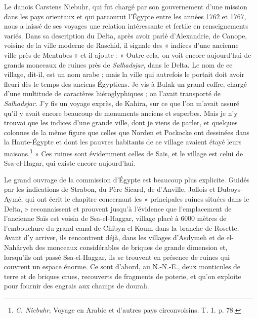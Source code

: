 \documentclass[letterpaper,twocolumn,openany,nodeprecatedcode]{dndbook}
\begin{document}
Le danois Carstens Niebuhr, qui fut chargé par son gouvernement d'une mission dans les pays orientaux et qui parcourut l'Égypte entre les années 1762 et 1767, nous a laissé de ses voyages une relation intéressante et fertile en renseignements variés. Dans sa description du Delta, après avoir parlé d'Alexandrie, de Canope, voisine de la ville moderne de Raschid, il signale des « indices d'une ancienne ville près de Mentubes » et il ajoute : « Outre cela, on voit encore aujourd'hui de grands monceaux de ruines près de \emph{Salhadsjar}, dans le Delta. Le nom de ce village, dit-il, est un nom arabe ; mais la ville qui autrefois le portait doit avoir fleuri dès le temps des anciens Égyptiens. Je vis à Bulak un grand coffre, chargé d'une multitude de caractères hiéroglyphiques ; on l'avait transporté de \emph{Salhadsjar}. J'y fis un voyage exprès, de Kahira, sur ce que l'on m'avait assuré qu'il y avait encore beaucoup de monuments anciens et superbes. Mais je n'y trouvai que les indices d'une grande ville, dont je viens de parler, et quelques colonnes de la même figure que celles que Norden et Pockocke ont dessinées dans la Haute-Égypte et dont les pauvres habitants de ce village avaient étayé leurs maisons.\footnote{\emph{C. Niebuhr}, Voyage en Arabie et d'autres pays circonvoisins. T. 1. p. 78.} » Ces ruines sont évidemment celles de Saïs, et le village est celui de Ssa-el-Hagar, qui existe encore aujourd'hui.

Le grand ouvrage de la commission d'Égypte est beaucoup plus explicite. Guidés par les indications de Strabon, du Père Sicard, de d'Anville, Jollois et Duboys-Aymé, qui ont écrit le chapitre concernant les « principales ruines situées dans le Delta, » reconnaissent et prouvent jusqu'à l'évidence que l'emplacement de l'ancienne Saïs est voisin de Ssa-el-Haggar, village placé à 6000 mètres de l'embouchure du grand canal de Chibyn-el-Koum dans la branche de Rosette. Avant d'y arriver, ils rencontrent déjà, dans les villages d'Asdymeh et de el-Nahâryeh des monceaux considérables de briques de grande dimension et, lorsqu'ils ont passé Ssa-el-Haggar, ils se trouvent en présence de ruines qui couvrent un espace énorme. Ce sont d'abord, au N.-N.-E., deux monticules de terre et de briques crues, recouverts de fragments de poterie, et qu'on exploite pour fournir des engrais aux champs de dourah.
\end{document}

